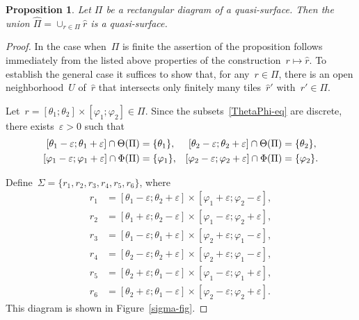 \documentclass{amsart}
\theoremstyle{theorem}
\newtheorem{prop}[theo]{Proposition}
\theoremstyle{remark}
\theoremstyle{definition}
\numberwithin{equation}{section}
\numberwithin{figure}{section}
\begin{document}
\begin{prop}
    Let $\Pi$ be a rectangular diagram of a quasi-surface. Then the union $\widehat \Pi = \cup_{r\in\Pi}\widehat{r}$ is a quasi-surface.
\end{prop}
\begin{proof}
In the case when~$\Pi$ is finite the assertion of the proposition follows immediately from the listed above properties
of the construction~$r\mapsto\widehat r$. To establish the general case it suffices
to show that, for any~$r\in\Pi$, there is an open neighborhood~$U$ of~$\widehat r$ that intersects
only finitely many tiles~$\widehat r'$ with~$r'\in\Pi$.

Let~$r=[\theta_1; \theta_2]\times[\varphi_1; \varphi_2]\in\Pi$. Since the subsets~\eqref{ThetaPhi-eq}
are discrete, there exists~$\varepsilon>0$ such that
$$\begin{aligned}\relax
[\theta_1-\varepsilon;\theta_1+\varepsilon]\cap\Theta(\Pi)&=\{\theta_1\},&
[\theta_2-\varepsilon;\theta_2+\varepsilon]\cap\Theta(\Pi)&=\{\theta_2\},\\
[\varphi_1-\varepsilon;\varphi_1+\varepsilon]\cap\Phi(\Pi)&=\{\varphi_1\},&
[\varphi_2-\varepsilon;\varphi_2+\varepsilon]\cap\Phi(\Pi)&=\{\varphi_2\}.
\end{aligned}
$$

Define~$\Sigma=\{r_1,r_2,r_3,r_4,r_5,r_6\}$, where
$$    \begin{aligned}
    r_1&= [\theta_1 - \varepsilon; \theta_2 + \varepsilon] \times [\varphi_1 + \varepsilon; \varphi_2-\varepsilon]   ,\\
    r_2&= [\theta_1 + \varepsilon; \theta_2 - \varepsilon] \times [\varphi_1 - \varepsilon; \varphi_2 + \varepsilon] ,\\
    r_3&= [\theta_1 - \varepsilon; \theta_1 + \varepsilon] \times [\varphi_2 + \varepsilon; \varphi_1 - \varepsilon] ,\\
    r_4&= [\theta_2 - \varepsilon; \theta_2 + \varepsilon] \times [\varphi_2 + \varepsilon; \varphi_1 - \varepsilon] ,\\
    r_5&= [\theta_2  + \varepsilon; \theta_1 - \varepsilon] \times [\varphi_1 - \varepsilon; \varphi_1 + \varepsilon],\\
    r_6&= [\theta_2  + \varepsilon; \theta_1 - \varepsilon] \times [\varphi_2 - \varepsilon; \varphi_2 + \varepsilon].
    \end{aligned}$$
This diagram is shown in Figure~\ref{sigma-fig}.


\end{proof}
\end{document}
